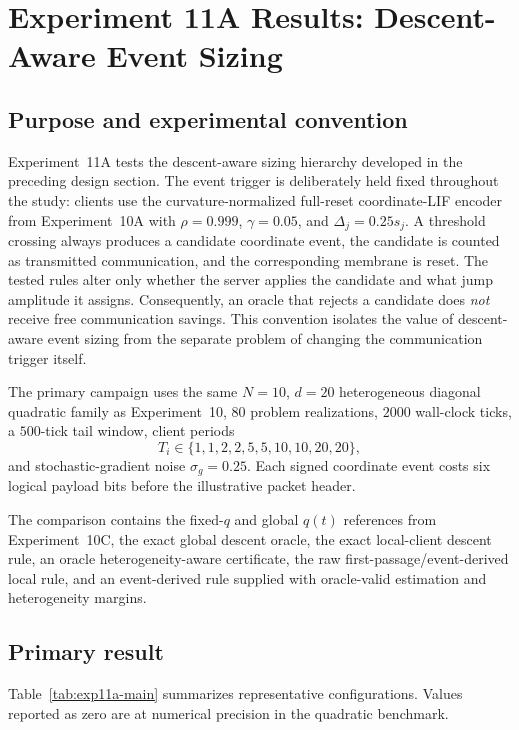 \section{Experiment 11A Results: Descent-Aware Event Sizing}
\label{sec:exp11a-results}

\subsection{Purpose and experimental convention}

Experiment~11A tests the descent-aware sizing hierarchy developed in the preceding design section. The event trigger is deliberately held fixed throughout the study: clients use the curvature-normalized full-reset coordinate-LIF encoder from Experiment~10A with $\rho=0.999$, $\gamma=0.05$, and $\Delta_j=0.25s_j$. A threshold crossing always produces a candidate coordinate event, the candidate is counted as transmitted communication, and the corresponding membrane is reset. The tested rules alter only whether the server applies the candidate and what jump amplitude it assigns. Consequently, an oracle that rejects a candidate does \emph{not} receive free communication savings. This convention isolates the value of descent-aware event sizing from the separate problem of changing the communication trigger itself.

The primary campaign uses the same $N=10$, $d=20$ heterogeneous diagonal quadratic family as Experiment~10, $80$ problem realizations, $2000$ wall-clock ticks, a $500$-tick tail window, client periods
\begin{equation}
  T_i\in\{1,1,2,2,5,5,10,10,20,20\},
\end{equation}
and stochastic-gradient noise $\sigma_g=0.25$. Each signed coordinate event costs six logical payload bits before the illustrative packet header.

The comparison contains the fixed-$q$ and global $q(t)$ references from Experiment~10C, the exact global descent oracle, the exact local-client descent rule, an oracle heterogeneity-aware certificate, the raw first-passage/event-derived local rule, and an event-derived rule supplied with oracle-valid estimation and heterogeneity margins.

\subsection{Primary result}

Table~\ref{tab:exp11a-main} summarizes representative configurations. Values reported as zero are at numerical precision in the quadratic benchmark.

